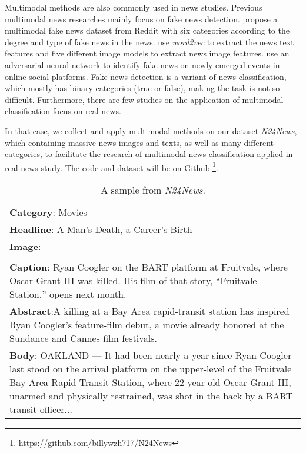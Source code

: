 \documentclass[10pt, a4paper]{article}
\begin{document}
Multimodal methods are also commonly used in news studies.
Previous multimodal news researches mainly focus on fake news detection. 
 propose a multimodal fake news dataset from Reddit with six categories according to the degree and type of fake news in the news. 
 use \textit{word2vec} to extract the news text features and five different image models to extract news image features.  use an adversarial neural network to identify fake news on newly emerged events in online social platforms. 
Fake news detection is a variant of news classification, which mostly has binary categories (true or false), making the task is not so difficult. Furthermore, there are few studies on the application of multimodal classification focus on real news.

In that case, we collect and apply multimodal methods on our dataset \textit{N24News}, which containing massive news images and texts, as well as many different categories, to facilitate the research of multimodal news classification applied in real news study. The code and dataset will be on Github \footnote{\url{https://github.com/billywzh717/N24News}}. 


\begin{table}[]
\centering
\begin{tabular}{|p{7.2cm}|}
\hline
\textbf{Category}: Movies \\
\textbf{Headline}: A Man’s Death, a Career’s Birth \\
\textbf{Image}: \\
 \\
\textbf{Caption}: Ryan Coogler on the BART platform at Fruitvale, where Oscar Grant III was killed. His film of that story, “Fruitvale Station,” opens next month. \\
\textbf{Abstract}:A killing at a Bay Area rapid-transit station has inspired Ryan Coogler’s feature-film debut, a movie already honored at the Sundance and Cannes film festivals. \\
\textbf{Body}: OAKLAND — It had been nearly a year since Ryan Coogler last stood on the arrival platform on the upper-level of the Fruitvale Bay Area Rapid Transit Station, where 22-year-old Oscar Grant III, unarmed and physically restrained, was shot in the back by a BART transit officer... \\ \hline
\end{tabular}
\caption{A sample from \textit{N24News}.}
\label{tab:example}
\end{table}
\end{document}
